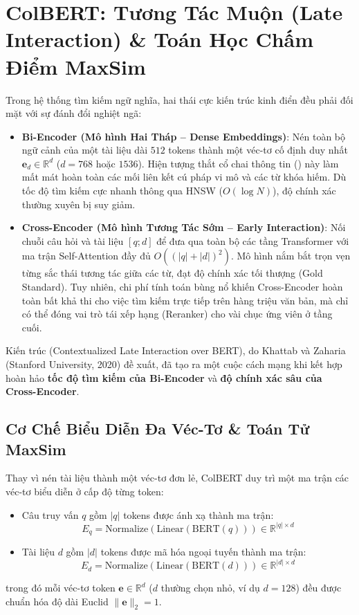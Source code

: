 \section{ColBERT: Tương Tác Muộn (Late Interaction) \& Toán Học Chấm Điểm MaxSim}
\label{sec:colbert-late-interaction}

Trong hệ thống tìm kiếm ngữ nghĩa, hai thái cực kiến trúc kinh điển đều phải đối mặt với sự đánh đổi nghiệt ngã:
\begin{itemize}
  \item \textbf{Bi-Encoder (Mô hình Hai Tháp -- Dense Embeddings)}: Nén toàn bộ ngữ cảnh của một tài liệu dài $512$ tokens thành một véc-tơ cố định duy nhất $\mathbf{e}_d \in \mathbb{R}^d$ ($d=768$ hoặc $1536$). Hiện tượng thắt cổ chai thông tin () này làm mất mát hoàn toàn các mối liên kết cú pháp vi mô và các từ khóa hiếm. Dù tốc độ tìm kiếm cực nhanh thông qua HNSW ($O(\log N)$), độ chính xác thường xuyên bị suy giảm.
  \item \textbf{Cross-Encoder (Mô hình Tương Tác Sớm -- Early Interaction)}: Nối chuỗi câu hỏi và tài liệu $[q; d]$ để đưa qua toàn bộ các tầng Transformer với ma trận Self-Attention đầy đủ $O((|q| + |d|)^2)$. Mô hình nắm bắt trọn vẹn từng sắc thái tương tác giữa các từ, đạt độ chính xác tối thượng (Gold Standard). Tuy nhiên, chi phí tính toán bùng nổ khiến Cross-Encoder hoàn toàn bất khả thi cho việc tìm kiếm trực tiếp trên hàng triệu văn bản, mà chỉ có thể đóng vai trò tái xếp hạng (Reranker) cho vài chục ứng viên ở tầng cuối.
\end{itemize}

Kiến trúc  (Contextualized Late Interaction over BERT), do Khattab và Zaharia (Stanford University, 2020) đề xuất, đã tạo ra một cuộc cách mạng khi kết hợp hoàn hảo \textbf{tốc độ tìm kiếm của Bi-Encoder} và \textbf{độ chính xác sâu của Cross-Encoder}.

\subsection{Cơ Chế Biểu Diễn Đa Véc-Tơ \& Toán Tử MaxSim}
Thay vì nén tài liệu thành một véc-tơ đơn lẻ, ColBERT duy trì một ma trận các véc-tơ biểu diễn ở cấp độ từng token:
\begin{itemize}
  \item Câu truy vấn $q$ gồm $|q|$ tokens được ánh xạ thành ma trận:
  \begin{equation}
  E_q = \text{Normalize}\left( \text{Linear}\left( \text{BERT}(q) \right) \right) \in \mathbb{R}^{|q| \times d}
  \end{equation}
  \item Tài liệu $d$ gồm $|d|$ tokens được mã hóa ngoại tuyến thành ma trận:
  \begin{equation}
  E_d = \text{Normalize}\left( \text{Linear}\left( \text{BERT}(d) \right) \right) \in \mathbb{R}^{|d| \times d}
  \end{equation}
\end{itemize}
trong đó mỗi véc-tơ token $\mathbf{e} \in \mathbb{R}^d$ ($d$ thường chọn nhỏ, ví dụ $d=128$) đều được chuẩn hóa độ dài Euclid $\|\mathbf{e}\|_2 = 1$.

